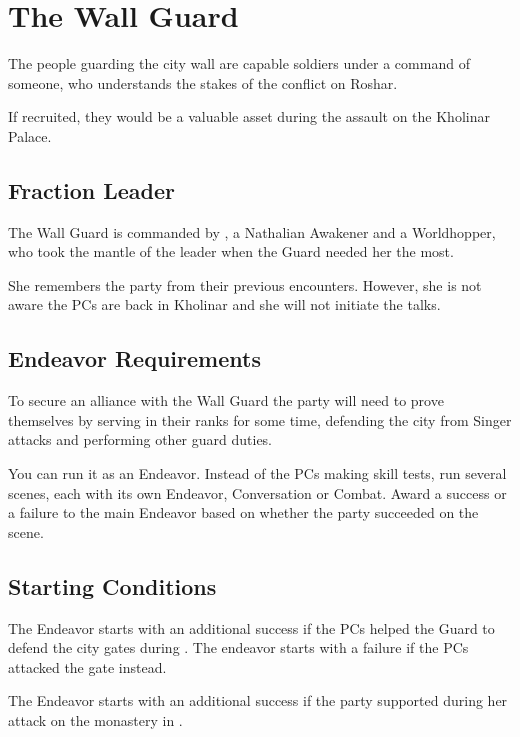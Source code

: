 \section{The Wall Guard}
\label{sec:theWall}

The people guarding the city wall are capable soldiers under a command of someone, who understands the stakes of the conflict on Roshar.

If recruited, they would be a valuable asset during the assault on the Kholinar Palace.


\subsection{Fraction Leader}

The Wall Guard is commanded by \npcHighmarshal{}, a Nathalian Awakener and a Worldhopper, who took the mantle of the leader when the Guard needed her the most.

She remembers the party from their previous encounters. However, she is not aware the PCs are back in Kholinar and she will not initiate the talks. 


\subsection{Endeavor Requirements}

To secure an alliance with the Wall Guard the party will need to prove themselves by serving in their ranks for some time, defending the city from Singer attacks and performing other guard duties.

You can run it as an Endeavor. Instead of the PCs making skill tests, run several scenes, each with its own Endeavor, Conversation or Combat. Award a success or a failure to the main Endeavor based on whether the party succeeded on the scene.




\subsection{Starting Conditions}

The Endeavor starts with an additional success if the PCs helped the Guard to defend the city gates during . The endeavor starts with a failure if the PCs attacked the gate instead.

The Endeavor starts with an additional success if the party supported \npcHighmarshal{} during her attack on the monastery in .

